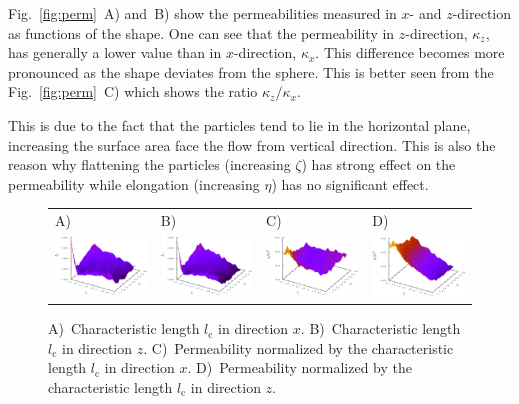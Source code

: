 \documentclass[aps,twocolumn,superscriptaddress,showpacs,showkeys]{revtex4-1}
\newcommand{\lc}{{l_{\mathrm{c}}}}  %
\begin{document}
Fig.~\ref{fig:perm}~A) and~B) show the permeabilities measured in $x$- and
$z$-direction as functions of the shape. One can see that the permeability in
$z$-direction, $\kappa_z$, has generally a lower value than in $x$-direction,
$\kappa_x$. This difference becomes more pronounced as the shape deviates from
the sphere. This is better seen from the Fig.~\ref{fig:perm}~C) which shows
the ratio $\kappa_z/\kappa_x$.

This is due to the fact that the particles tend to lie in the horizontal
plane, increasing the surface area face the flow from vertical direction.
This is also the reason why flattening the particles (increasing $\zeta$) has
strong effect on the permeability while elongation (increasing $\eta$) has no
significant effect.
%
\begin{figure}
\begin{tabular}{l l l l}
A) & B) & C) & D) \\
\includegraphics*[width=0.48\columnwidth]{data-figs/lc_x} &
\includegraphics*[width=0.48\columnwidth]{data-figs/lc_z} &
\includegraphics*[width=0.48\columnwidth]{data-figs/k_lc_x} &
\includegraphics*[width=0.48\columnwidth]{data-figs/k_lc_z}
\end{tabular}
\caption{
A)~Characteristic length $\lc$ in direction $x$.
B)~Characteristic length $\lc$ in direction $z$.
C)~Permeability normalized by the characteristic length $\lc$ in direction
$x$.
D)~Permeability normalized by the characteristic length $\lc$ in direction $z$.
\label{fig:lc}
}
\end{figure}
%
\end{document}
